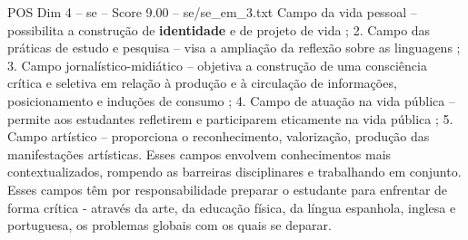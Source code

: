 \begin{textsample}{POS Dim 4 – se – Score 9.00 – se/se\_em\_3.txt}
Campo da vida pessoal – possibilita a construção de \textbf{identidade} e de projeto de vida ; 2.
Campo das práticas de estudo e pesquisa – visa a ampliação da reflexão sobre as linguagens ; 3.
Campo jornalístico-midiático – objetiva a construção de uma consciência crítica e seletiva em relação à produção e à circulação de informações, posicionamento e induções de consumo ; 4.
Campo de atuação na vida pública – permite aos estudantes refletirem e participarem eticamente na vida pública ; 5.
Campo artístico – proporciona o reconhecimento, valorização, produção das manifestações artísticas.
Esses campos envolvem conhecimentos mais contextualizados, rompendo as barreiras disciplinares e trabalhando em conjunto.
Esses campos têm por responsabilidade preparar o estudante para enfrentar de forma crítica - através da arte, da educação física, da língua espanhola, inglesa e portuguesa, os problemas globais com os quais se deparar.

\end{textsample}
